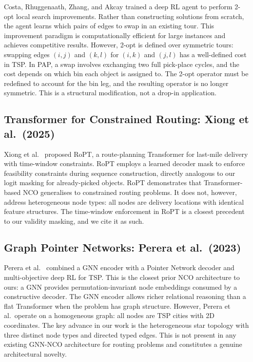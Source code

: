 \documentclass[conference]{IEEEtran}
\begin{document}
Costa, Rhuggenaath, Zhang, and Akcay \cite{costa2020learning2opt} trained a deep RL agent to perform 2-opt local search improvements. Rather than constructing solutions from scratch, the agent learns which pairs of edges to swap in an existing tour. This improvement paradigm is computationally efficient for large instances and achieves competitive results. However, 2-opt is defined over symmetric tours: swapping edges $(i,j)$ and $(k,l)$ for $(i,k)$ and $(j,l)$ has a well-defined cost in TSP. In PAP, a swap involves exchanging two full pick-place cycles, and the cost depends on which bin each object is assigned to. The 2-opt operator must be redefined to account for the bin leg, and the resulting operator is no longer symmetric. This is a structural modification, not a drop-in application.

\subsection{Transformer for Constrained Routing: Xiong et al.\ (2025)}

Xiong et al.\ \cite{xiong2025ropt} proposed RoPT, a route-planning Transformer for last-mile delivery with time-window constraints. RoPT employs a learned decoder mask to enforce feasibility constraints during sequence construction, directly analogous to our logit masking for already-picked objects. RoPT demonstrates that Transformer-based NCO generalises to constrained routing problems. It does not, however, address heterogeneous node types: all nodes are delivery locations with identical feature structures. The time-window enforcement in RoPT is a closest precedent to our validity masking, and we cite it as such.

\subsection{Graph Pointer Networks: Perera et al.\ (2023)}

Perera et al.\ \cite{perera2023gpn} combined a GNN encoder with a Pointer Network decoder and multi-objective deep RL for TSP. This is the closest prior NCO architecture to ours: a GNN provides permutation-invariant node embeddings consumed by a constructive decoder. The GNN encoder allows richer relational reasoning than a flat Transformer when the problem has graph structure. However, Perera et al.\ operate on a homogeneous graph: all nodes are TSP cities with 2D coordinates. The key advance in our work is the heterogeneous star topology with three distinct node types and directed typed edges. This is not present in any existing GNN-NCO architecture for routing problems and constitutes a genuine architectural novelty.
\end{document}
